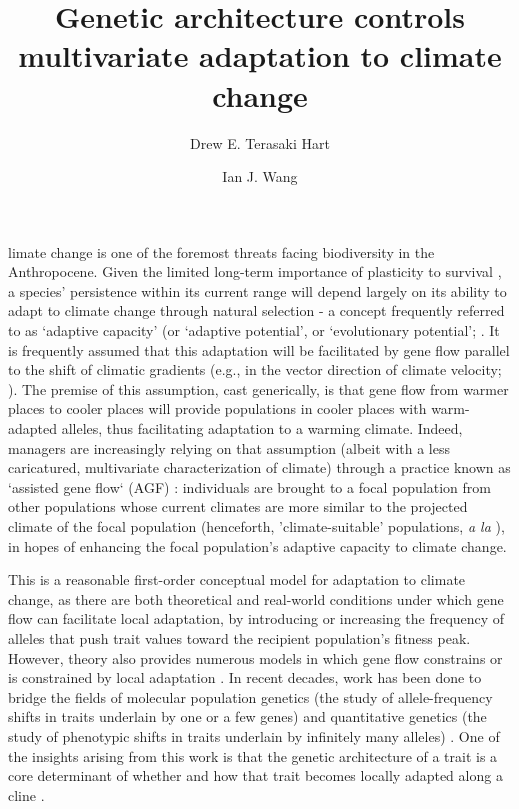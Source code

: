 \documentclass[9pt,twocolumn,twoside,lineno]{pnas-new}
\title{Genetic architecture controls multivariate adaptation to climate change}
\author[a,1]{Drew E. Terasaki Hart}
\author[a]{Ian J. Wang}
\affil[a]{Department of Environmental Science, Policy, and Management, University of California, Berkeley, CA 94720}
\begin{document}
\maketitle
\thispagestyle{firststyle}

limate change is one of the foremost threats facing biodiversity in the Anthropocene.
Given the limited long-term importance of plasticity to survival \cite{chevin},
a species’ persistence within its current range will depend largely on its ability to
adapt to climate change through natural selection - a concept frequently referred to 
as `adaptive capacity’ (or `adaptive potential’, or `evolutionary potential’; 
\cite{chevin,harrisson,nicotra,vilas,wade}.
It is frequently assumed that this adaptation will be facilitated
by gene flow parallel to the shift of climatic gradients
(e.g., in the vector
direction of climate velocity; \cite{ackerly}).
The premise of this 
assumption, cast generically, is that gene flow from warmer places to
cooler places will provide populations in cooler places with warm-adapted alleles,
thus facilitating adaptation to a warming climate. 
Indeed, managers are increasingly relying on that assumption
(albeit with a less caricatured, multivariate characterization of climate)
through a practice known as `assisted gene flow` (AGF) \cite{aitken_whitlock}:
individuals are brought to a focal population
from other populations whose current 
climates are more similar to the projected climate of the focal population
(henceforth, 'climate-suitable' populations, \textit{a la} \cite{bellis}),
in hopes of enhancing the focal population's adaptive capacity to climate change.

This is a reasonable first-order conceptual model
for adaptation to climate change,
as there are both theoretical
\cite{aitken_whitlock,slatkin,tigano}
and real-world conditions under which \cite{feder}
gene flow can facilitate local adaptation,
by introducing or increasing the frequency of alleles 
that push trait values toward
the recipient population's fitness peak.
However, theory also provides numerous models
in which gene flow constrains or is constrained by
local adaptation
\cite{wang,lenormand,slatkin,haldane,wright,felsenstein}.
In recent decades, work has been done to bridge the fields
of molecular population genetics
(the study of allele-frequency shifts
in traits underlain by one or a few genes)
and quantitative genetics
(the study of phenotypic shifts in
traits underlain by infinitely many alleles)
\cite{barghi_polygenic,barton,pritchard_human_adaptation,pritchard_sweeps_alone}.
One of the insights arising from this work is that
the genetic architecture of a trait
is a core determinant of
whether and how that trait
becomes locally adapted along a cline \cite{yeaman_review}. 
\end{document}
